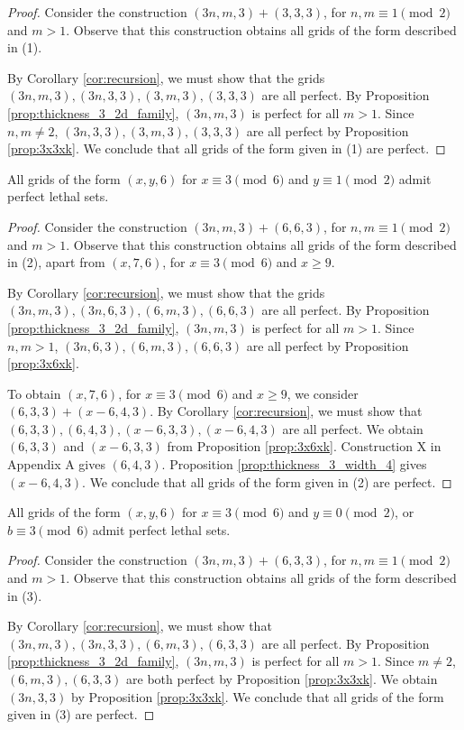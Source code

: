 \begin{proof}
Consider the construction $(3n,m,3) + (3,3,3)$, for $n,m \equiv 1 \pmod 2$ and $m > 1$. Observe that this construction obtains all grids of the form described in (1).

By Corollary \ref{cor:recursion}, we must show that the grids $(3n,m,3), (3n,3,3), (3,m,3),(3,3,3)$ are all perfect. By Proposition \ref{prop:thickness_3_2d_family}, $(3n,m,3)$ is perfect for all $m > 1$. Since $n,m \neq 2$, $(3n,3,3), (3,m,3),(3,3,3)$ are all perfect by Proposition \ref{prop:3x3xk}. We conclude that all grids of the form given in (1) are perfect.
\end{proof}

\begin{lem}
\label{lem:thickness_6_case_2}
All grids of the form $(x,y,6)$ for $x \equiv 3 \pmod 6$ and $y \equiv 1 \pmod 2$ admit perfect lethal sets.
\end{lem}

\begin{proof}
Consider the construction $(3n,m,3) + (6,6,3)$, for $n,m \equiv 1 \pmod 2$ and $m > 1$. Observe that this construction obtains all grids of the form described in (2), apart from $(x,7,6)$, for $x \equiv 3 \pmod 6$ and $x \geq 9$. 

By Corollary \ref{cor:recursion}, we must show that the grids $(3n,m,3), (3n,6,3), (6,m,3), (6,6,3)$ are all perfect. By Proposition \ref{prop:thickness_3_2d_family}, $(3n,m,3)$ is perfect for all $m > 1$. Since $n,m > 1$, $(3n,6,3), (6,m,3), (6,6,3)$ are all perfect by Proposition \ref{prop:3x6xk}.

To obtain $(x,7,6)$, for $x \equiv 3 \pmod 6$ and $x \geq 9$, we consider $(6,3,3) + (x-6, 4,3)$. By Corollary \ref{cor:recursion}, we must show that $(6,3,3), (6,4,3), (x-6,3,3), (x-6,4,3)$ are all perfect. We obtain $(6,3,3)$ and $(x-6,3,3)$ from Proposition \ref{prop:3x6xk}. Construction X in Appendix A gives $(6,4,3)$. Proposition \ref{prop:thickness_3_width_4} gives $(x-6,4,3)$. We conclude that all grids of the form given in (2) are perfect. 
\end{proof}

\begin{lem}
\label{lem:thickness_6_case_3}
All grids of the form $(x,y,6)$ for $x \equiv 3 \pmod 6$ and $y \equiv 0 \pmod 2$, or $b \equiv 3 \pmod 6$ admit perfect lethal sets.
\end{lem}

\begin{proof}
Consider the construction $(3n,m,3) + (6,3,3)$, for $n,m \equiv 1 \pmod 2$ and $m > 1$. Observe that this construction obtains all grids of the form described in (3). 

By Corollary \ref{cor:recursion}, we must show that $(3n,m,3), (3n,3,3), (6,m,3), (6,3,3)$ are all perfect. By Proposition \ref{prop:thickness_3_2d_family}, $(3n,m,3)$ is perfect for all $m > 1$. Since $m \neq 2$, $(6,m,3),(6,3,3)$ are both perfect by Proposition \ref{prop:3x3xk}. We obtain $(3n,3,3)$ by Proposition \ref{prop:3x3xk}. We conclude that all grids of the form given in (3) are perfect.
\end{proof}

